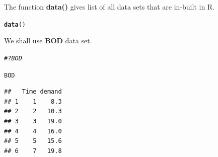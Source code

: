 \documentclass[11pt, a4paper]{article}\usepackage[]{graphicx}\usepackage[]{xcolor}
\makeatletter
\newcommand{\hlcom}[1]{\textcolor[rgb]{0.678,0.584,0.686}{\textit{#1}}}%
\newcommand{\hlstd}[1]{\textcolor[rgb]{0.345,0.345,0.345}{#1}}%
\newcommand{\hlkwd}[1]{\textcolor[rgb]{0.737,0.353,0.396}{\textbf{#1}}}%
\newenvironment{kframe}{%
 \def\at@end@of@kframe{}%
 \ifinner\ifhmode%
  \def\at@end@of@kframe{\end{minipage}}%
  \begin{minipage}{\columnwidth}%
 \fi\fi%
 \def\FrameCommand##1{\hskip\@totalleftmargin \hskip-\fboxsep
 \colorbox{shadecolor}{##1}\hskip-\fboxsep
     \hskip-\linewidth \hskip-\@totalleftmargin \hskip\columnwidth}%
 \MakeFramed {\advance\hsize-\width
   \@totalleftmargin\z@ \linewidth\hsize
   \@setminipage}}%
 {\par\unskip\endMakeFramed%
 \at@end@of@kframe}
\newenvironment{knitrout}{}{} %
\makeatother
\begin{document}
The function \textbf{data()} gives list of all data sets that are in-built in R.
\begin{knitrout}
\color{fgcolor}\begin{kframe}
\begin{alltt}
\hlkwd{data}\hlstd{()}
\end{alltt}
\end{kframe}
\end{knitrout}

We shall use \textbf{BOD} data set.
\begin{knitrout}
\color{fgcolor}\begin{kframe}
\begin{alltt}
\hlcom{# ?BOD}
\end{alltt}
\end{kframe}
\end{knitrout}

\begin{knitrout}
\color{fgcolor}\begin{kframe}
\begin{alltt}
\hlstd{BOD}
\end{alltt}
\begin{verbatim}
##   Time demand
## 1    1    8.3
## 2    2   10.3
## 3    3   19.0
## 4    4   16.0
## 5    5   15.6
## 6    7   19.8
\end{verbatim}
\end{kframe}
\end{knitrout}

\newpage
\end{document}
